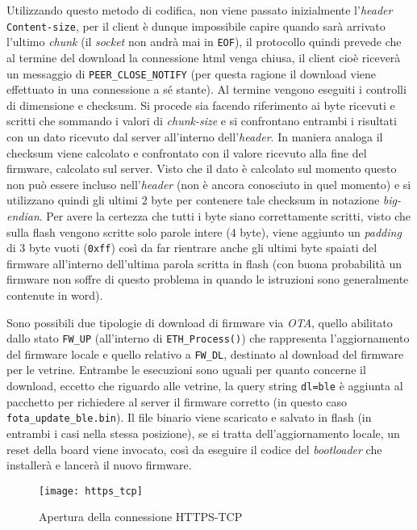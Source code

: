Utilizzando questo metodo di codifica, non viene passato inizialmente l'\textit{header} \texttt{Content-size}, per il client \`e dunque impossibile capire quando sar\`a arrivato l'ultimo \textit{chunk} (il \textit{socket} non andr\`a mai in \texttt{EOF}), il protocollo quindi prevede che al termine del download la connessione html venga chiusa, il client cio\`e ricever\`a un messaggio di \texttt{PEER\_CLOSE\_NOTIFY} (per questa ragione il download viene effettuato in una connessione a s\'e stante). Al termine vengono eseguiti i controlli di dimensione e checksum. Si procede sia facendo riferimento ai byte ricevuti e scritti che sommando i valori di \textit{chunk-size} e si confrontano entrambi i risultati con un dato ricevuto dal server all'interno dell'\textit{header}. In maniera analoga il checksum viene calcolato e confrontato con il valore ricevuto alla fine del firmware, calcolato sul server. Visto che il dato \`e calcolato sul momento questo non pu\`o essere incluso nell'\textit{header} (non \`e ancora conosciuto in quel momento) e si utilizzano quindi gli ultimi 2 byte per contenere tale checksum in notazione \textit{big-endian}. Per avere la certezza che tutti i byte siano correttamente scritti, visto che sulla flash vengono scritte solo parole intere (4 byte), viene aggiunto un \textit{padding} di 3 byte vuoti (\texttt{0xff}) cos\`i da far rientrare anche gli ultimi byte spaiati del firmware all'interno dell'ultima parola scritta in flash (con buona probabilit\`a un firmware non soffre di questo problema in quando le istruzioni sono generalmente contenute in word).

Sono possibili due tipologie di download di firmware via \textit{OTA}, quello abilitato dallo stato \texttt{FW\_UP} (all'interno di \texttt{ETH\_Process()}) che rappresenta l'aggiornamento del firmware locale e quello relativo a \texttt{FW\_DL}, destinato al download del firmware per le vetrine. Entrambe le esecuzioni sono uguali per quanto concerne il download, eccetto che riguardo alle vetrine, la query string \texttt{dl=ble} \`e aggiunta al pacchetto per richiedere al server il firmware corretto (in questo caso \texttt{fota\_update\_ble.bin}). Il file binario viene scaricato e salvato in flash (in entrambi i casi nella stessa posizione), se si tratta dell'aggiornamento locale, un reset della board viene invocato, cos\`i da eseguire il codice del \textit{bootloader} che installer\`a e lancer\`a il nuovo firmware.

\begin{figure}[ht]
  \center
    \texttt{[image: https\_tcp]}
    \caption{Apertura della connessione HTTPS-TCP}
  \label{fig:https_tcp}
\end{figure}

